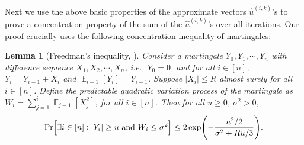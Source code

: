 \documentclass[11pt]{article}
\newtheorem{lemma}[theorem]{Lemma}
\let\originalleft\left
\let\originalright\right
\renewcommand{\left}{\mathopen{}\mathclose\bgroup\originalleft}
\renewcommand{\right}{\aftergroup\egroup\originalright}
\newcommand\uu{\boldsymbol{\mathit{u}}}
\newcommand{\wh}{\widehat}
\DeclareMathOperator*{\E}{{\mathbb{E}}}
\begin{document}
Next we use the above basic properties of the approximate vectors $\wh{\uu}^{(i,k)}$'s to prove a concentration property of the sum of the $\wh{\uu}^{(i,k)}$'s over all iterations. Our proof crucially uses the following concentration inequality of martingales:

\begin{lemma}[Freedman's inequality, \cite{freedman1975tail}]\label{thm:freedman}
Consider a martingale $Y_0, Y_1, \cdots, Y_n$ with difference sequence $X_1, X_2, \cdots, X_n$, i.e., $Y_0 = 0$, and for all $i \in [n]$, $Y_i = Y_{i-1} + X_i$ and $\E_{i-1}[Y_i] = Y_{i-1}$. Suppose $|X_i| \leq R$ almost surely for all $i \in [n]$. Define the predictable quadratic variation process of the martingale as $W_i = \sum_{j=1}^{i} \E_{j-1}[X_j^2]$, for all $i \in [n]$. Then for all $u \geq 0$, $\sigma^2 > 0$,
\[
\Pr\left[ \exists i \in [n]: |Y_i| \geq u \text{ and } W_i \leq \sigma^2 \right] \leq 2 \exp\left(-\frac{u^2/2}{\sigma^2 + R u / 3}\right).
\]
\end{lemma}
\end{document}
